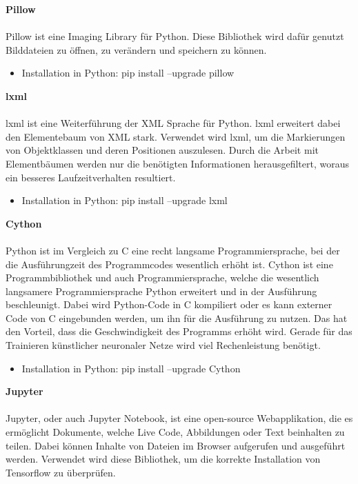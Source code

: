 \documentclass[a4paper,12pt,oneside]{article}
\begin{document}
\textbf{Pillow}\\\\
Pillow ist eine \glqq Imaging Library \glqq für Python. Diese Bibliothek wird dafür genutzt Bilddateien zu öffnen, zu verändern und speichern zu können.

  \begin{itemize}
\item Installation in Python: pip install --upgrade pillow
  \end{itemize}

\textbf{lxml}\\\\ 
lxml ist eine Weiterführung der XML Sprache für Python. lxml erweitert dabei den Elementebaum von XML stark. Verwendet wird lxml, um die Markierungen von Objektklassen und deren Positionen auszulesen. Durch die Arbeit mit Elementbäumen werden nur die benötigten Informationen herausgefiltert, woraus ein besseres Laufzeitverhalten resultiert.
  
  \begin{itemize}
\item Installation in Python: pip install --upgrade lxml
  \end{itemize}
  
  
\textbf{Cython}\\\\
Python ist im Vergleich zu C eine recht langsame Programmiersprache, bei der die Ausführungzeit des Programmcodes wesentlich erhöht ist. Cython ist eine Programmbibliothek und auch Programmiersprache, welche die wesentlich langsamere Programmiersprache Python erweitert und in der Ausführung beschleunigt. Dabei wird Python-Code in C kompiliert oder es kann externer Code von C eingebunden werden, um ihn für die Ausführung zu nutzen. Das hat den Vorteil, dass die Geschwindigkeit des Programms erhöht wird. Gerade für das Trainieren künstlicher neuronaler Netze wird viel Rechenleistung benötigt.

  \begin{itemize}
\item Installation in Python: pip install --upgrade Cython
  \end{itemize}

\textbf{Jupyter}\\\\
Jupyter, oder auch \glqq Jupyter Notebook\grqq, ist eine open-source Webapplikation, die es ermöglicht Dokumente, welche Live Code, Abbildungen oder Text beinhalten zu teilen. Dabei können Inhalte von Dateien im Browser aufgerufen und ausgeführt werden. Verwendet wird diese Bibliothek, um die korrekte Installation von Tensorflow zu überprüfen.  
\end{document}
